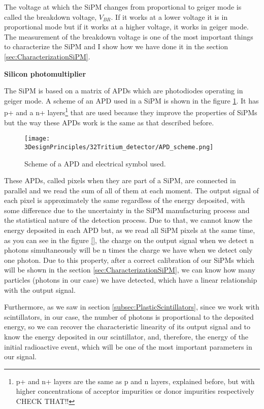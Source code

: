 The voltage at which the SiPM changes from proportional to geiger mode is called the breakdown voltage, $ V_ {BR} $. If it works at a lower voltage it is in proportional mode but if it works at a higher voltage, it works in geiger mode. The measurement of the breakdown voltage is one of the most important things to characterize the SiPM and I show how we have done it in the section \ref{sec:CharacterizationSiPM}.

\textbf{Silicon photomultiplier}

The SiPM is based on a matrix of APDs which are photodiodes operating in geiger mode. A scheme of an APD used in a SiPM is shown in the figure \ref{fig:SchemeAPD}. It has p+ and a n+ layers\footnote{p+ and n+ layers are the same as p and n layers, explained before, but with higher concentrations of acceptor impurities or donor impurities respectively CHECK THAT!!} that are used because they improve the properties of SiPMs but the way these APDs work is the same as that described before. 

\begin{figure}[htbp]
\centering
\texttt{[image: 3DesignPrinciples/32Tritium\_detector/APD\_scheme.png]}
\caption{Scheme of a APD and electrical symbol used.\label{fig:SchemeAPD}~\cite{OSI}}
\end{figure}
 
These APDs, called pixels when they are part of a SiPM, are connected in parallel and we read the sum of all of them at each moment. The output signal of each pixel is approximately the same regardless of the energy deposited, with some difference due to the uncertainty in the SiPM manufacturing process and the statistical nature of the detection process. Due to that, we cannot know the energy deposited in each APD but, as we read all SiPM pixels at the same time, as you can see in the figure \ref{}, the charge on the output signal when we detect n photons simultaneously will be n times the charge we have when we detect only one photon. Due to this property, after a correct calibration of our SiPMs which will be shown in the section \ref{sec:CharacterizationSiPM}, we can know how many particles (photons in our case) we have detected, which have a linear relationship with the output signal. 

Furthermore, as we saw in section \ref{subsec:PlasticScintillators}, since we work with scintillators, in our case, the number of photons is proportional to the deposited energy, so we can recover the characteristic linearity of its output signal and to know the energy deposited in our scintillator, and, therefore, the energy of the initial radioactive event, which will be one of the most important parameters in our signal.

